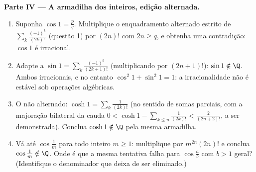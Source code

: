 \begin{problem}
\medskip
\noindent\textbf{Parte IV --- A armadilha dos inteiros, edição
alternada.}
\begin{enumerate}[resume]
  \item Suponha $\cos 1 = \frac pq$. Multiplique o enquadramento alternado estrito
        de $\sum_{k}
        \frac{(-1)^k}{(2k)!}$ (questão 1) por $(2n)!$ com $2n
        \geq q$, e obtenha uma
        contradição: $\cos 1$ é irracional.
  \item Adapte a $\sin 1 = \sum_k \frac{(-1)^k}{(2k+1)!}$
        (multiplicando por $(2n+1)!$): $\sin 1 \notin \Q$. Ambos
        irracionais, e no entanto $\cos^2 1 + \sin^2 1 = 1$: a irracionalidade
        não é estável sob operações algébricas.
  \item O  não alternado: $\cosh 1 = \sum_k
        \frac{1}{(2k)!}$ (no sentido de somas parciais,
        com a majoração bilateral da cauda $0 < \cosh 1 - \sum_{k \leq n}
        \frac{1}{(2k)!} < \frac{2}{(2n+2)!}$, a ser demonstrada).
        Conclua $\cosh 1 \notin \Q$ pela mesma armadilha.
  \item Vá até $\cos\frac 1m$ para todo inteiro $m \geq 1$:
        multiplique por $m^{2n}(2n)!$ e conclua $\cos\frac1m
        \notin \Q$. Onde é que a mesma
        tentativa falha para $\cos\frac ab$ com $b > 1$ geral? (Identifique o
        denominador que deixa de ser eliminado.)
\end{enumerate}


\end{problem}
